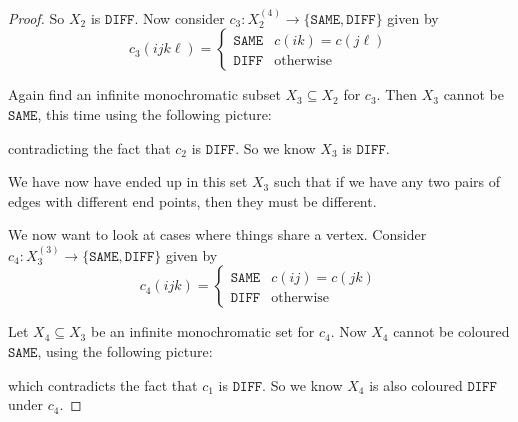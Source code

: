 \documentclass[a4paper]{article}
\begin{document}
\begin{proof}
  So $X_2$ is $\mathtt{DIFF}$. Now consider $c_3: X_2^{(4)} \to \{\mathtt{SAME}, \mathtt{DIFF}\}$ given by
  \[
    c_3(ijk\ell) =
    \begin{cases}
      \mathtt{SAME} & c(ik) = c(j\ell)\\
      \mathtt{DIFF} & \mathrm{otherwise}
    \end{cases}
  \]
  \begin{center}
  \end{center}
  Again find an infinite monochromatic subset $X_3 \subseteq X_2$ for $c_3$. Then $X_3$ cannot be $\mathtt{SAME}$, this time using the following picture:
   \begin{center}
  \end{center}
  contradicting the fact that $c_2$ is $\mathtt{DIFF}$. So we know $X_3$ is $\mathtt{DIFF}$.

  We have now have ended up in this set $X_3$ such that if we have any two pairs of edges with different end points, then they must be different.

  We now want to look at cases where things share a vertex. Consider $c_4: X_3^{(3)} \to \{\mathtt{SAME}, \mathtt{DIFF}\}$ given by
  \[
    c_4(ijk) =
    \begin{cases}
      \mathtt{SAME} & c(ij) = c(jk)\\
      \mathtt{DIFF} & \mathrm{otherwise}
    \end{cases}
  \]
  \begin{center}
  \end{center}
  Let $X_4 \subseteq X_3$ be an infinite monochromatic set for $c_4$. Now $X_4$ cannot be coloured $\mathtt{SAME}$, using the following picture:
  \begin{center}
  \end{center}
  which contradicts the fact that $c_1$ is $\mathtt{DIFF}$. So we know $X_4$ is also coloured $\mathtt{DIFF}$ under $c_4$.


\end{proof}
\end{document}
